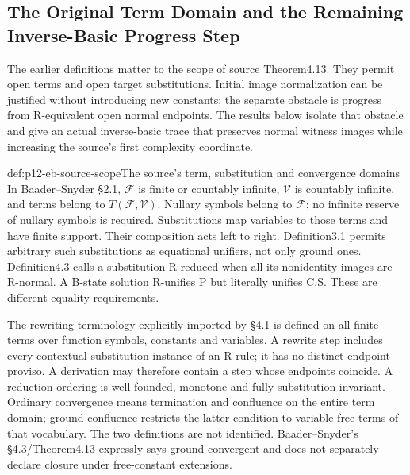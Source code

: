 \subsection{The Original Term Domain and the Remaining Inverse-Basic Progress Step}
\label{sec:p12-equational-basic-completeness}

The earlier definitions matter to the scope of source Theorem4.13.
They permit open terms and open target substitutions. Initial image
normalization can be justified without introducing new constants;
the separate obstacle is progress from R-equivalent open normal
endpoints. The results below isolate that obstacle and give an actual
inverse-basic trace that preserves normal witness images while
increasing the source's first complexity coordinate.
\cite[\S2.1, pp.~451--452; \S4.3, pp.~495--498]{BaaderSnyder2001}

\begin{hbdefinition}{def:p12-eb-source-scope}{The source's term, substitution and convergence domains}
In Baader--Snyder \S2.1, \(\mathcal F\) is finite or countably
infinite, \(\mathcal V\) is countably infinite, and terms belong to
\(T(\mathcal F,\mathcal V)\). Nullary symbols belong to
\(\mathcal F\); no infinite reserve of nullary symbols is required.
Substitutions map variables to those terms and have finite support.
Their composition acts left to right. Definition3.1 permits arbitrary
such substitutions as equational unifiers, not only ground ones.
Definition4.3 calls a substitution R-reduced when all its nonidentity
images are R-normal. A B-state solution R-unifies P but literally
unifies C,S. These are different equality requirements.
\cite[pp.~451--452,469--470,489,495]{BaaderSnyder2001}

The rewriting terminology explicitly imported by \S4.1 is defined
on all finite terms over function symbols, constants and variables.
A rewrite step includes every contextual substitution instance of
an R-rule; it has no distinct-endpoint proviso. A derivation may
therefore contain a step whose endpoints coincide. A reduction
ordering is well founded, monotone and fully substitution-invariant.
Ordinary convergence means termination and confluence on the entire
term domain; ground confluence restricts the latter condition to
variable-free terms of that vocabulary. The two definitions are
not identified. Baader--Snyder's \S4.3/Theorem4.13 expressly says
ground convergent and does not separately declare closure under
free-constant extensions.
\cite[\S2, pp.~541--543; Definitions4.3--4.5, pp.~546--547;
Definitions5.5--5.6, pp.~560--561]{DershowitzPlaisted2001Rewriting}
\cite[pp.~488,496--497]{BaaderSnyder2001}
\end{hbdefinition}

